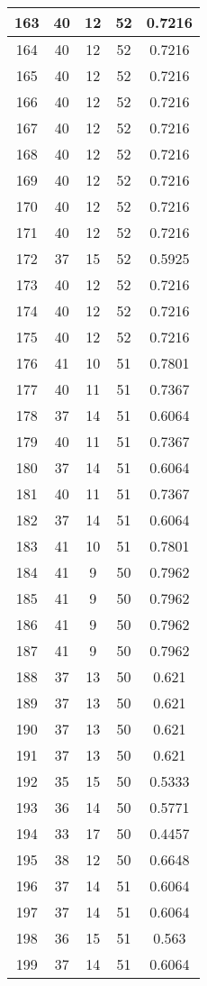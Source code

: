 \documentclass[letterpaper, 12pt]{article}
\begin{document}
\begin{longtable}{|c|c|c|c|c|}
\hline
163 & 40 & 12 & 52 & 0.7216 \\
\hline
164 & 40 & 12 & 52 & 0.7216 \\
\hline
165 & 40 & 12 & 52 & 0.7216 \\
\hline
166 & 40 & 12 & 52 & 0.7216 \\
\hline
167 & 40 & 12 & 52 & 0.7216 \\
\hline
168 & 40 & 12 & 52 & 0.7216 \\
\hline
169 & 40 & 12 & 52 & 0.7216 \\
\hline
170 & 40 & 12 & 52 & 0.7216 \\
\hline
171 & 40 & 12 & 52 & 0.7216 \\
\hline
172 & 37 & 15 & 52 & 0.5925 \\
\hline
173 & 40 & 12 & 52 & 0.7216 \\
\hline
174 & 40 & 12 & 52 & 0.7216 \\
\hline
175 & 40 & 12 & 52 & 0.7216 \\
\hline
176 & 41 & 10 & 51 & 0.7801 \\
\hline
177 & 40 & 11 & 51 & 0.7367 \\
\hline
178 & 37 & 14 & 51 & 0.6064 \\
\hline
179 & 40 & 11 & 51 & 0.7367 \\
\hline
180 & 37 & 14 & 51 & 0.6064 \\
\hline
181 & 40 & 11 & 51 & 0.7367 \\
\hline
182 & 37 & 14 & 51 & 0.6064 \\
\hline
183 & 41 & 10 & 51 & 0.7801 \\
\hline
184 & 41 & 9 & 50 & 0.7962 \\
\hline
185 & 41 & 9 & 50 & 0.7962 \\
\hline
186 & 41 & 9 & 50 & 0.7962 \\
\hline
187 & 41 & 9 & 50 & 0.7962 \\
\hline
188 & 37 & 13 & 50 & 0.621 \\
\hline
189 & 37 & 13 & 50 & 0.621 \\
\hline
190 & 37 & 13 & 50 & 0.621 \\
\hline
191 & 37 & 13 & 50 & 0.621 \\
\hline
192 & 35 & 15 & 50 & 0.5333 \\
\hline
193 & 36 & 14 & 50 & 0.5771 \\
\hline
194 & 33 & 17 & 50 & 0.4457 \\
\hline
195 & 38 & 12 & 50 & 0.6648 \\
\hline
196 & 37 & 14 & 51 & 0.6064 \\
\hline
197 & 37 & 14 & 51 & 0.6064 \\
\hline
198 & 36 & 15 & 51 & 0.563 \\
\hline
199 & 37 & 14 & 51 & 0.6064 \\
\hline
\end{longtable}
\end{document}
